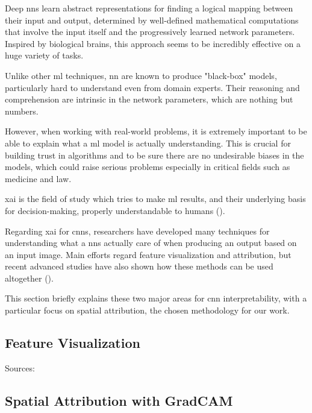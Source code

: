 
Deep \gls{nn}s learn abstract representations for finding a logical mapping between their input and output, determined by well-defined mathematical computations that involve the input itself and the progressively learned network parameters. Inspired by biological brains, this approach seems to be incredibly effective on a huge variety of tasks.

Unlike other \gls{ml} techniques, \gls{nn} are known to produce "black-box" models, particularly hard to understand even from domain experts. Their reasoning and comprehension are intrinsic in the network parameters, which are nothing but numbers.

\medskip 

However, when working with real-world problems, it is extremely important to be able to explain what a \gls{ml} model is actually understanding. This is crucial for building trust in algorithms and to be sure there are no undesirable biases in the models, which could raise serious problems especially in critical fields such as medicine and law.

\gls{xai} is the field of study which tries to make \gls{ml} results, and their underlying basis for decision-making, properly understandable to humans (\cite{xai-wiki}). 

\medskip 

Regarding \gls{xai} for \gls{cnn}s, researchers have developed many techniques for understanding what a \gls{nn}s actually care of when producing an output based on an input image. Main efforts regard feature visualization and attribution, but recent advanced studies have also shown how these methods can be used altogether (\cite{olah2018the}).

This section briefly explains these two major areas for \gls{cnn} interpretability, with a particular focus on spatial attribution, the chosen methodology for our work.



\subsection{Feature Visualization}

Sources: \cite{olah2017feature}



\subsection{Spatial Attribution with GradCAM}
\label{subsec:gradcam-theory}

